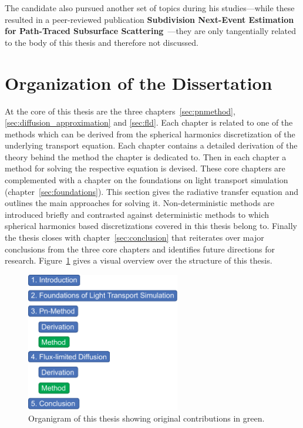 The candidate also pursued another set of topics during his studies---while these resulted in a peer-reviewed publication \textbf{Subdivision Next-Event Estimation for Path-Traced Subsurface Scattering}~\cite{Koerner16}---they are only tangentially related to the body of this thesis and therefore not discussed.

\section{Organization of the Dissertation}

At the core of this thesis are the three chapters~\ref{sec:pnmethod}, \ref{sec:diffusion_approximation} and \ref{sec:fld}. Each chapter is related to one of the methods which can be derived from the spherical harmonics discretization of the underlying transport equation. Each chapter contains a detailed derivation of the theory behind the method the chapter is dedicated to. Then in each chapter a method for solving the respective equation is devised. These core chapters are complemented with a chapter on the foundations on light transport simulation (chapter~\ref{sec:foundations}). This section gives the radiative transfer equation and outlines the main approaches for solving it. Non-deterministic methods are introduced briefly and contrasted against deterministic methods to which spherical harmonics based discretizations covered in this thesis belong to. Finally the thesis closes with chapter~\ref{sec:conclusion} that reiterates over major conclusions from the three core chapters and identifies future directions for research. Figure~\ref{fig:intro_organization} gives a visual overview over the structure of this thesis.
\begin{figure}[ht]
\hspace{0.1\columnwidth}
\includegraphics[width=0.6\textwidth]{02_Introduction/figures/fig_organigram.pdf}
\caption{Organigram of this thesis showing original contributions in green.}
\label{fig:intro_organization}
\end{figure}








